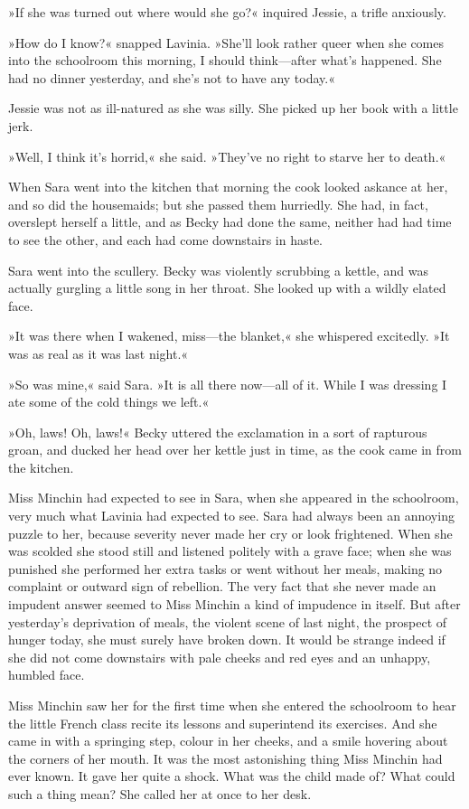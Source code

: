 »If she was turned out where would she go?« inquired Jessie, a trifle anxiously.

»How do I know?« snapped Lavinia. »She'll look rather queer when she comes into the schoolroom this morning, I should think—after what's happened. She had no dinner yesterday, and she's not to have any today.«

Jessie was not as ill-natured as she was silly. She picked up her book with a little jerk.

»Well, I think it's horrid,« she said. »They've no right to starve her to death.«

When Sara went into the kitchen that morning the cook looked askance at her, and so did the housemaids; but she passed them hurriedly. She had, in fact, overslept herself a little, and as Becky had done the same, neither had had time to see the other, and each had come downstairs in haste.

Sara went into the scullery. Becky was violently scrubbing a kettle, and was actually gurgling a little song in her throat. She looked up with a wildly elated face.

»It was there when I wakened, miss—the blanket,« she whispered excitedly. »It was as real as it was last night.«

»So was mine,« said Sara. »It is all there now—all of it. While I was dressing I ate some of the cold things we left.«

»Oh, laws! Oh, laws!« Becky uttered the exclamation in a sort of rapturous groan, and ducked her head over her kettle just in time, as the cook came in from the kitchen.

Miss Minchin had expected to see in Sara, when she appeared in the schoolroom, very much what Lavinia had expected to see. Sara had always been an annoying puzzle to her, because severity never made her cry or look frightened. When she was scolded she stood still and listened politely with a grave face; when she was punished she performed her extra tasks or went without her meals, making no complaint or outward sign of rebellion. The very fact that she never made an impudent answer seemed to Miss Minchin a kind of impudence in itself. But after yesterday's deprivation of meals, the violent scene of last night, the prospect of hunger today, she must surely have broken down. It would be strange indeed if she did not come downstairs with pale cheeks and red eyes and an unhappy, humbled face.

Miss Minchin saw her for the first time when she entered the schoolroom to hear the little French class recite its lessons and superintend its exercises. And she came in with a springing step, colour in her cheeks, and a smile hovering about the corners of her mouth. It was the most astonishing thing Miss Minchin had ever known. It gave her quite a shock. What was the child made of? What could such a thing mean? She called her at once to her desk.

